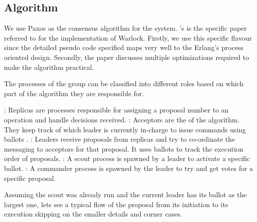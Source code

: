 \subsection{Algorithm}

We use Paxos  as the consensus algorithm for the system.
\citet{Robbert2011}'s  is the specific paper
referred to for the implementation of
Warlock. Firstly, we use this specific flavour since the detailed pseudo code
specified maps very well to the Erlang's process oriented%
 design. Secondly, the paper discusses multiple optimizations required to make
the algorithm practical.

The processes of the group can be classified into different roles based on
which part of the algorithm they are responsible for.

\begin{itemize}
    : Replicas are processes responsible for assigning a proposal
    number to an operation and handle decisions received.
    : Acceptors are the  of the algorithm. They keep
    track of which leader is currently in-charge to issue commands using
    ballots%
    .
    : Leaders receive proposals from replicas and try to
    co-ordinate the messaging to acceptors for that proposal. It uses ballots
    to track the execution order of proposals.
    : A scout process is spawned by a leader to activate a specific
    ballot.
    : A commander process is spawned by the leader to try
    and get votes for a specific proposal.
\end{itemize}

Assuming the scout was already run and the current leader has its ballot as the
largest one, lets see a typical flow of the proposal from its initiation to its
execution skipping on the smaller details and corner cases.

